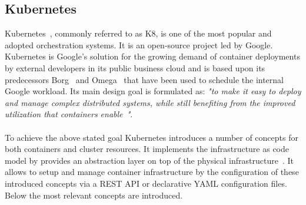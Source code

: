 \subsection{Kubernetes}
Kubernetes~\cite{kubernetes}, commonly referred to as K8,  is one of the most popular and adopted orchestration systems. It is an open-source project led by Google. Kubernetes is Google's solution for the growing demand of container deployments by external developers in its public business cloud and is based upon its predecessors  Borg~\cite{verma2015large} and Omega~\cite{schwarzkopf2013omega} that have been used to schedule the internal Google workload. Its main design goal is formulated as:\textit{ "to make it easy to deploy and manage complex distributed systems, while still benefiting from the improved utilization that containers enable~\cite{Burns:2016:BOK:2930840.2890784}"}.  \\\\
\noindent To achieve the above stated goal Kubernetes introduces a number of concepts for both containers and cluster resources. It implements the infrastructure as code model  by provides an abstraction layer on top of the physical infrastructure~\cite{hermanns2015current}. It allows to setup and manage container infrastructure by the configuration of these introduced concepts via a REST API or declarative YAML configuration files. Below the most relevant concepts are introduced.
